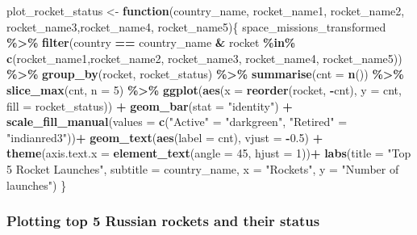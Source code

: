 \documentclass[
]{article}
\newenvironment{Shaded}{\begin{snugshade}}{\end{snugshade}}
\newcommand{\AttributeTok}[1]{\textcolor[rgb]{0.13,0.29,0.53}{#1}}
\newcommand{\ControlFlowTok}[1]{\textcolor[rgb]{0.13,0.29,0.53}{\textbf{#1}}}
\newcommand{\DecValTok}[1]{\textcolor[rgb]{0.00,0.00,0.81}{#1}}
\newcommand{\FloatTok}[1]{\textcolor[rgb]{0.00,0.00,0.81}{#1}}
\newcommand{\FunctionTok}[1]{\textcolor[rgb]{0.13,0.29,0.53}{\textbf{#1}}}
\newcommand{\NormalTok}[1]{#1}
\newcommand{\OtherTok}[1]{\textcolor[rgb]{0.56,0.35,0.01}{#1}}
\newcommand{\SpecialCharTok}[1]{\textcolor[rgb]{0.81,0.36,0.00}{\textbf{#1}}}
\newcommand{\StringTok}[1]{\textcolor[rgb]{0.31,0.60,0.02}{#1}}
\begin{document}
\begin{Shaded}
\begin{Highlighting}[]
\NormalTok{plot\_rocket\_status }\OtherTok{\textless{}{-}} \ControlFlowTok{function}\NormalTok{(country\_name, rocket\_name1, rocket\_name2, rocket\_name3,rocket\_name4, rocket\_name5)\{}
\NormalTok{  space\_missions\_transformed }\SpecialCharTok{\%\textgreater{}\%}
    \FunctionTok{filter}\NormalTok{(country }\SpecialCharTok{==}\NormalTok{ country\_name }\SpecialCharTok{\&}\NormalTok{ rocket }\SpecialCharTok{\%in\%} \FunctionTok{c}\NormalTok{(rocket\_name1,rocket\_name2, rocket\_name3, rocket\_name4, rocket\_name5)) }\SpecialCharTok{\%\textgreater{}\%} 
    \FunctionTok{group\_by}\NormalTok{(rocket, rocket\_status) }\SpecialCharTok{\%\textgreater{}\%}
    \FunctionTok{summarise}\NormalTok{(}\AttributeTok{cnt =} \FunctionTok{n}\NormalTok{()) }\SpecialCharTok{\%\textgreater{}\%} 
    \FunctionTok{slice\_max}\NormalTok{(cnt, }\AttributeTok{n =} \DecValTok{5}\NormalTok{) }\SpecialCharTok{\%\textgreater{}\%} 
    \FunctionTok{ggplot}\NormalTok{(}\FunctionTok{aes}\NormalTok{(}\AttributeTok{x =} \FunctionTok{reorder}\NormalTok{(rocket, }\SpecialCharTok{{-}}\NormalTok{cnt), }\AttributeTok{y =}\NormalTok{ cnt, }\AttributeTok{fill =}\NormalTok{ rocket\_status)) }\SpecialCharTok{+}
    \FunctionTok{geom\_bar}\NormalTok{(}\AttributeTok{stat =} \StringTok{"identity"}\NormalTok{) }\SpecialCharTok{+}
    \FunctionTok{scale\_fill\_manual}\NormalTok{(}\AttributeTok{values =} \FunctionTok{c}\NormalTok{(}\StringTok{"Active"} \OtherTok{=} \StringTok{"darkgreen"}\NormalTok{, }\StringTok{"Retired"} \OtherTok{=} \StringTok{"indianred3"}\NormalTok{))}\SpecialCharTok{+}
    \FunctionTok{geom\_text}\NormalTok{(}\FunctionTok{aes}\NormalTok{(}\AttributeTok{label =}\NormalTok{ cnt), }\AttributeTok{vjust =} \SpecialCharTok{{-}}\FloatTok{0.5}\NormalTok{) }\SpecialCharTok{+}
    \FunctionTok{theme}\NormalTok{(}\AttributeTok{axis.text.x =} \FunctionTok{element\_text}\NormalTok{(}\AttributeTok{angle =} \DecValTok{45}\NormalTok{, }\AttributeTok{hjust =} \DecValTok{1}\NormalTok{))}\SpecialCharTok{+}
    \FunctionTok{labs}\NormalTok{(}\AttributeTok{title =}  \StringTok{"Top 5 Rocket Launches"}\NormalTok{,}
      \AttributeTok{subtitle =}\NormalTok{ country\_name,}
      \AttributeTok{x =} \StringTok{"Rockets"}\NormalTok{, }
      \AttributeTok{y =} \StringTok{"Number of launches"}\NormalTok{)}
\NormalTok{\}}
\end{Highlighting}
\end{Shaded}

\hypertarget{plotting-top-5-russian-rockets-and-their-status}{%
\subsubsection{Plotting top 5 Russian rockets and their
status}\label{plotting-top-5-russian-rockets-and-their-status}}
\end{document}
